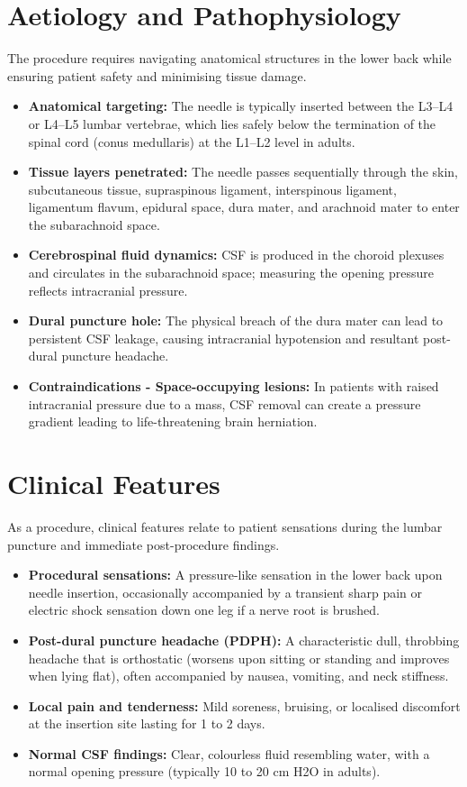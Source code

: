 \section*{Aetiology and Pathophysiology}
The procedure requires navigating anatomical structures in the lower back while ensuring patient safety and minimising tissue damage.
\begin{itemize}
    \item \textbf{Anatomical targeting:} The needle is typically inserted between the L3--L4 or L4--L5 lumbar vertebrae, which lies safely below the termination of the spinal cord (conus medullaris) at the L1--L2 level in adults.
    \item \textbf{Tissue layers penetrated:} The needle passes sequentially through the skin, subcutaneous tissue, supraspinous ligament, interspinous ligament, ligamentum flavum, epidural space, dura mater, and arachnoid mater to enter the subarachnoid space.
    \item \textbf{Cerebrospinal fluid dynamics:} CSF is produced in the choroid plexuses and circulates in the subarachnoid space; measuring the opening pressure reflects intracranial pressure.
    \item \textbf{Dural puncture hole:} The physical breach of the dura mater can lead to persistent CSF leakage, causing intracranial hypotension and resultant post-dural puncture headache.
    \item \textbf{Contraindications - Space-occupying lesions:} In patients with raised intracranial pressure due to a mass, CSF removal can create a pressure gradient leading to life-threatening brain herniation.
\end{itemize}

\section*{Clinical Features}
As a procedure, clinical features relate to patient sensations during the lumbar puncture and immediate post-procedure findings.
\begin{itemize}
    \item \textbf{Procedural sensations:} A pressure-like sensation in the lower back upon needle insertion, occasionally accompanied by a transient sharp pain or electric shock sensation down one leg if a nerve root is brushed.
    \item \textbf{Post-dural puncture headache (PDPH):} A characteristic dull, throbbing headache that is orthostatic (worsens upon sitting or standing and improves when lying flat), often accompanied by nausea, vomiting, and neck stiffness.
    \item \textbf{Local pain and tenderness:} Mild soreness, bruising, or localised discomfort at the insertion site lasting for 1 to 2 days.
    \item \textbf{Normal CSF findings:} Clear, colourless fluid resembling water, with a normal opening pressure (typically 10 to 20 cm H2O in adults).
\end{itemize}

